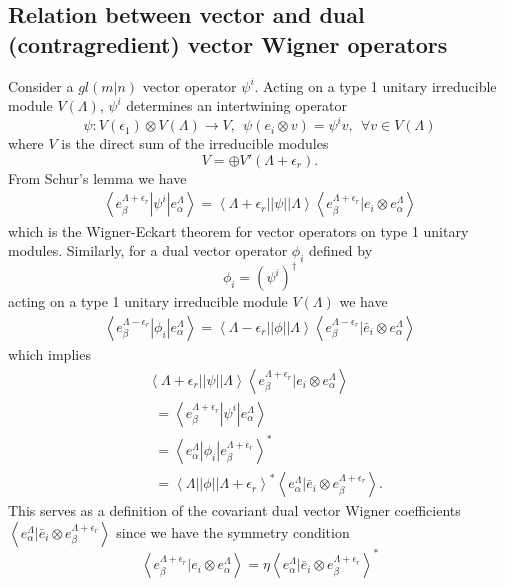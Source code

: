 \documentclass[12pt]{article}
\begin{document}
\subsection{Relation between vector and dual (contragredient) vector Wigner operators}
Consider a $gl(m|n)$ vector operator $\psi^i$. Acting on a type 1 unitary irreducible module $V(\Lambda)$, $\psi^i$ determines an intertwining operator 
$$
\psi: V(\epsilon_1) \otimes V(\Lambda) \rightarrow V, ~~ \psi(e_i \otimes v) = \psi^i v, ~~\forall v \in V(\Lambda)
$$
where $V$ is the direct sum of the irreducible modules
$$
V = \oplus V'(\Lambda + \epsilon_r).
$$
From Schur's lemma we have
\begin{align*}
\left\langle e_\beta^{\Lambda  + \epsilon_r} | \psi^i | e^{\Lambda}_\alpha \right\rangle 
= \left \langle \Lambda + \epsilon_r || \psi || \Lambda \right \rangle
\left\langle e^{\Lambda+\epsilon_r}_\beta | e_i \otimes e^{\Lambda}_\alpha \right\rangle
\end{align*}
which is the Wigner-Eckart theorem for vector operators on type 1 unitary modules. Similarly, for a dual vector operator $\phi_i$ defined by
$$
\phi_i = (\psi^i)^\dagger
$$
acting on a type 1 unitary irreducible module $V(\Lambda)$  we have
\begin{align*}
\left\langle e_\beta^{\Lambda  - \epsilon_r} | \phi_i | e^{\Lambda}_\alpha \right\rangle 
= \left \langle \Lambda - \epsilon_r || \phi || \Lambda \right \rangle
\left\langle e^{\Lambda-\epsilon_r}_\beta | \bar{e}_i \otimes e^{\Lambda}_\alpha \right\rangle
\end{align*}
which implies
~~
\begin{align*}
&\left \langle \Lambda + \epsilon_r || \psi || \Lambda \right \rangle
\left\langle e^{\Lambda+\epsilon_r}_\beta | e_i \otimes e^{\Lambda}_\alpha \right\rangle \\
&~~= \left\langle e_\beta^{\Lambda  + \epsilon_r} | \psi^i | e^{\Lambda}_\alpha \right\rangle \\
&~~= \left\langle e_\alpha^{\Lambda} | \phi_i | e^{\Lambda + \epsilon_r}_\beta \right\rangle^*\\
&~~=\left \langle \Lambda || \phi || \Lambda + \epsilon_r \right \rangle^*
\left\langle e^{\Lambda}_\alpha | \bar{e}_i \otimes e^{\Lambda+\epsilon_r}_\beta \right\rangle.
\end{align*}
This serves as a definition of the  covariant dual vector Wigner coefficients $\left\langle e^{\Lambda}_\alpha | \bar{e}_i \otimes e^{\Lambda+\epsilon_r}_\beta \right\rangle$ since we have the symmetry condition
$$
\left\langle e^{\Lambda+\epsilon_r}_\beta | e_i \otimes e^{\Lambda}_\alpha \right\rangle
= \eta \left\langle e^{\Lambda}_\alpha | \bar{e}_i \otimes e^{\Lambda+\epsilon_r}_\beta \right\rangle^*
$$
\end{document}
